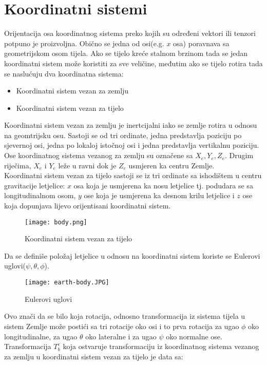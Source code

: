 \section{Koordinatni sistemi}
Orijentacija osa koordinatnog sistema preko kojih su određeni 
vektori ili tenzori potpuno je proizvoljna. Obično se jedna od osi(e.g. $x$ osa) poravnava 
sa geometrijskom osom tijela. 
Ako se tijelo kreće stalnom brzinom tada se jedan koordinatni sistem može 
koristiti za sve veličine, međutim ako se tijelo rotira tada se naslućuju dva koordinatna sistema:
\begin{itemize}
    \item Koordinatni sistem vezan za zemlju
    \item Koordinatni sistem vezan za tijelo
\end{itemize}
Koordinatni sistem vezan za zemlju je inertcijalni iako se zemlje rotira u odnosu na geomtrijsku osu.
Sastoji se od tri ordinate, jedna predstavlja poziciju po sjevernoj osi, jedna po lokaloj istočnoj osi 
i jedna predstavlja vertikalnu poziciju. Ose koordinatnog sistema vezanog za zemlju su 
označene sa $X_e, Y_e, Z_e$. Drugim riječima, $X_e$ i $Y_e$ leže u ravni dok je $Z_e$ usmjeren ka centru Zemlje.\\
Koordinatni sistem vezan za tijelo sastoji se iz tri ordinate sa ishodištem u centru gravitacije letjelice: $x$ osa koja je
usmjerena ka nosu letjelice tj. podudara se sa longitudinalnom osom, $y$ ose koja je usmjerena ka desnom krilu letjelice i $z$ ose koja dopunjava lijevo orijentisani 
koordinatni sistem.
\begin{figure}[!ht]
    \centering
    \texttt{[image: body.png]}
    \caption{Koordinatni sistem vezan za tijelo}
    \label{fig:KBS}
\end{figure}
Da se definiše položaj letjelice u odnosu na koordinatni sistem koriste se Eulerovi uglovi($\psi, \theta, \phi$).
\begin{figure}[!ht]
    \centering
    \texttt{[image: earth-body.JPG]}
    \caption{Eulerovi uglovi}
\end{figure}
Ovo znači da se bilo koja rotacija, odnosno transformacija iz sistema tijela u sistem Zemlje može postići sa tri rotacije oko osi i to prva 
rotacija za ugao $\phi$ oko longitudinalne, za ugao $\theta$ oko lateralne i za ugao 
$\psi$ oko normalne ose. Transformacija $T_b^e$ koja ostvaruje transformaciju iz 
koordinatnog sistema vezanog za zemlju u koordinatni sistem vezan za tijelo je data sa:
